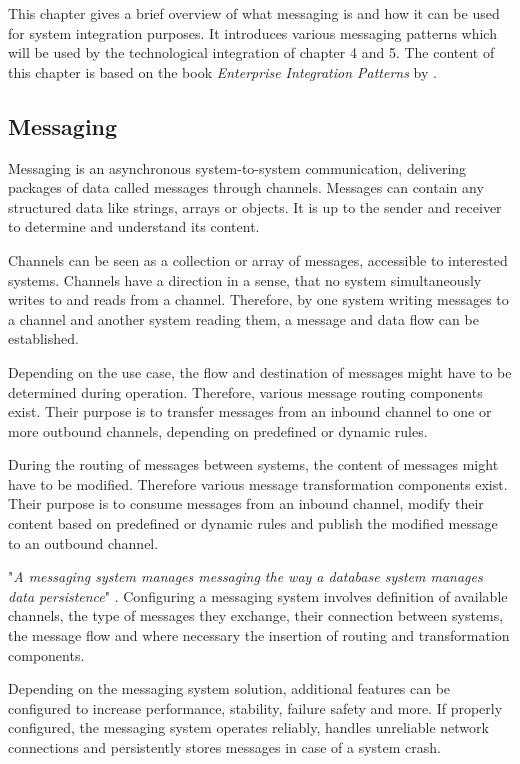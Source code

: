 This chapter gives a brief overview of what messaging is and how it can be used for system integration purposes. It introduces various messaging patterns which will be used by the technological integration of chapter 4 and 5.
The content of this chapter is based on the book \textit{Enterprise Integration Patterns} by \textcite{EIP}.

\subsection{Messaging}

Messaging is an asynchronous system-to-system communication, delivering packages of data called messages through channels. Messages can contain any structured data like strings, arrays or objects. It is up to the sender and receiver to determine and understand its content.

Channels can be seen as a collection or array of messages, accessible to interested systems. Channels have a direction in a sense, that no system simultaneously writes to and reads from a channel. Therefore, by one system writing messages to a channel and another system reading them, a message and data flow can be established.

Depending on the use case, the flow and destination of messages might have to be determined during operation. Therefore, various message routing components exist. Their purpose is to transfer messages from an inbound channel to one or more outbound channels, depending on predefined or dynamic rules.

During the routing of messages between systems, the content of messages might have to be modified. Therefore various message transformation components exist. Their purpose is to consume messages from an inbound channel, modify their content based on predefined or dynamic rules and publish the modified message to an outbound channel.

"\textit{A messaging system manages messaging the way a database system manages data persistence}" \cite[p. 31]{EIP}. Configuring a messaging system involves definition of available channels, the type of messages they exchange, their connection between systems, the message flow and where necessary the insertion of routing and transformation components.

Depending on the messaging system solution, additional features can be configured to increase performance, stability, failure safety and more. If properly configured, the messaging system operates reliably, handles unreliable network connections and persistently stores messages in case of a system crash.

